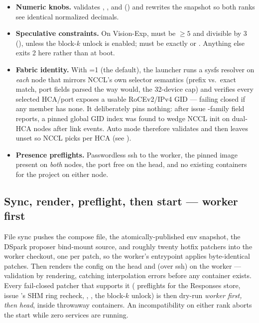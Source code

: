 \begin{itemize}
  \item \textbf{Numeric knobs.}  validates
    , , and
     () and rewrites the
    snapshot so both ranks see identical normalized decimals.
  \item \textbf{Speculative constraints.} On Vision-Exp,
     must be $\geq 5$ and divisible by 3
    (), unless the block-$k$ unlock is enabled;
     must be exactly  or
    . Anything else exits 2 here rather than at boot.
  \item \textbf{Fabric identity.} With =1 (the
    default), the launcher runs a sysfs resolver on \emph{each} node that
    mirrors NCCL's own  selector semantics (prefix
    vs.\ exact match, port fields parsed the way  would, the
    32-device cap) and verifies every selected HCA/port exposes a usable
    RoCEv2/IPv4 GID --- failing closed if any member has none. It deliberately
    pins nothing: after issue -family field reports, a pinned
    global GID index was found to wedge NCCL init on dual-HCA nodes after
    link events. Auto mode therefore validates and then leaves
     unset so NCCL picks per HCA
    (see ).
  \item \textbf{Presence preflights.} Passwordless ssh to the worker, the
    pinned image present on \emph{both} nodes, the port free on the head, and
    no existing containers for the project on either node.
\end{itemize}

\subsection{Sync, render, preflight, then start --- worker first}

File sync pushes the compose file, the atomically-published env snapshot, the
DSpark proposer bind-mount source, and roughly twenty hotfix patchers into the
worker checkout, one  per patch, so the worker's entrypoint applies
byte-identical patches. Then  renders the
config on the head and (over ssh) on the worker --- validation by rendering,
catching interpolation errors before any container exists. Every fail-closed
patcher that supports it ( preflights for the Responses store,
issue 's SHM ring recheck, , , the
block-$k$ unlock) is then dry-run \emph{worker first, then head}, inside
throwaway  containers. An incompatibility on
either rank aborts the start while zero services are running.

